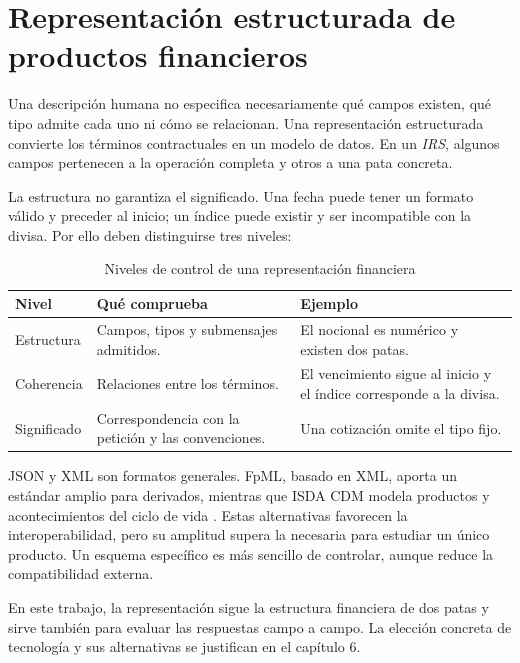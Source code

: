 \section{Representación estructurada de productos financieros}
\label{sec:representacion_estructurada}

Una descripción humana no especifica necesariamente qué campos existen, qué tipo admite cada uno ni cómo se relacionan. Una representación estructurada convierte los términos contractuales en un modelo de datos. En un \textit{IRS}, algunos campos pertenecen a la operación completa y otros a una pata concreta.

La estructura no garantiza el significado. Una fecha puede tener un formato válido y preceder al inicio; un índice puede existir y ser incompatible con la divisa. Por ello deben distinguirse tres niveles:

\begin{table}[H]
\centering
\small
\caption{Niveles de control de una representación financiera}
\label{tab:niveles_validacion_datos}
\begin{tabular}{|P{3.1cm}|P{4.8cm}|P{4.9cm}|}
\hline
\textbf{Nivel} & \textbf{Qué comprueba} & \textbf{Ejemplo} \\
\hline
Estructura & Campos, tipos y submensajes admitidos. & El nocional es numérico y existen dos patas. \\
\hline
Coherencia & Relaciones entre los términos. & El vencimiento sigue al inicio y el índice corresponde a la divisa. \\
\hline
Significado & Correspondencia con la petición y las convenciones. & Una cotización omite el tipo fijo. \\
\hline
\end{tabular}
\end{table}

JSON y XML son formatos generales. FpML, basado en XML, aporta un estándar amplio para derivados, mientras que ISDA CDM modela productos y acontecimientos del ciclo de vida \citep{fpml-home,isda2023cdm}. Estas alternativas favorecen la interoperabilidad, pero su amplitud supera la necesaria para estudiar un único producto. Un esquema específico es más sencillo de controlar, aunque reduce la compatibilidad externa.

En este trabajo, la representación sigue la estructura financiera de dos patas y sirve también para evaluar las respuestas campo a campo. La elección concreta de tecnología y sus alternativas se justifican en el capítulo 6.

